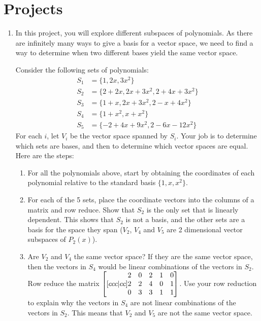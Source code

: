 \section{Projects}
\begin{enumerate}
	\item In this project, you will explore different subspaces of polynomials. As there are infinitely many ways to give a basis for a vector space, we need to find a way to determine when two different bases yield the same vector space.
	
	Consider the following sets of polynomials:
	\begin{align*}
		S_1&=\{1, 2 x, 3 x^2\} \\
		S_2&=\{2 + 2 x, 2 x + 3 x^2, 2 + 4 x + 3 x^2\} \\
		S_3&=\{1 + x, 2 x + 3 x^2, 2 - x + 4 x^2\} \\
		S_4&=\{1 + x^2, x + x^2\} \\
		S_5&=\{-2 + 4 x + 9 x^2, 2 - 6 x - 12 x^2\}
	\end{align*}
	For each $i$, let $V_i$ be the vector space spanned by $S_i$. Your job is to determine which sets are bases, and then to determine which vector spaces are equal. Here are the steps:
	
\begin{enumerate}
	\item For all the polynomials above, start by obtaining the coordinates of each polynomial relative to the standard basis $\{1,x,x^2\}$.
	\item For each of the 5 sets, place the coordinate vectors into the columns of a matrix and row reduce. Show that $S_2$ is the only set that is linearly dependent. This shows that $S_2$ is not a basis, and the other sets are a basis for the space they span ($V_2$, $V_4$ and $V_5$ are 2 dimensional vector subspaces of $P_2(x)$).
	
	\item Are $V_2$ and $V_4$ the same vector space? If they are the same vector space, then the vectors in $S_4$ would be linear combinations of the vectors in $S_2$. Row reduce the matrix
	$\begin{bmatrix}[ccc|cc]
	\begin{matrix} 2\\2\\0 \end{matrix}
	&\begin{matrix} 0\\2\\3 \end{matrix}
	&\begin{matrix} 2\\4\\3 \end{matrix}
	&\begin{matrix} 1\\0\\1 \end{matrix}
	&\begin{matrix} 0\\1\\1 \end{matrix}\end{bmatrix}$. Use your row reduction to explain why the vectors in $S_4$ are not linear combinations of the vectors in $S_2$. This means that $V_2$ and $V_5$ are not the same vector space. 
	

\end{enumerate}
\end{enumerate}
